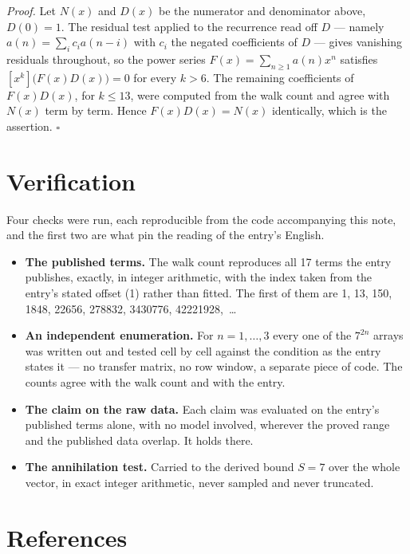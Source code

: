 \documentclass[11pt]{article}
\theoremstyle{definition}
\begin{document}
{\itshape Proof.} Let $N(x)$ and $D(x)$ be the numerator and denominator above, $D(0)=1$. The residual test applied to the recurrence read off $D$ --- namely $a(n) = \sum_i c_i a(n-i)$ with $c_i$ the negated coefficients of $D$ --- gives vanishing residuals throughout, so the power series $F(x)=\sum_{n\ge 1}a(n)x^n$ satisfies $[x^k]\bigl(F(x)D(x)\bigr) = 0$ for every $k > 6$. The remaining coefficients of $F(x)D(x)$, for $k \le 13$, were computed from the walk count and agree with $N(x)$ term by term. Hence $F(x)D(x) = N(x)$ identically, which is the assertion. $\square$

\section{Verification}

Four checks were run, each reproducible from the code accompanying this note, and the first two are what pin the reading of the entry's English.

\begin{itemize}

\item {\bfseries The published terms.} The walk count reproduces all 17 terms the entry publishes, exactly, in integer arithmetic, with the index taken from the entry's stated offset (1) rather than fitted. The first of them are 1, 13, 150, 1848, 22656, 278832, 3430776, 42221928,~\dots

\item {\bfseries An independent enumeration.} For $n = 1,\dots,3$ every one of the $7^{2n}$ arrays was written out and tested cell by cell against the condition as the entry states it --- no transfer matrix, no row window, a separate piece of code. The counts agree with the walk count and with the entry.

\item {\bfseries The claim on the raw data.} Each claim was evaluated on the entry's published terms alone, with no model involved, wherever the proved range and the published data overlap. It holds there.

\item {\bfseries The annihilation test.} Carried to the derived bound $S = 7$ over the whole vector, in exact integer arithmetic, never sampled and never truncated.

\end{itemize}

\section{References}
\end{document}
